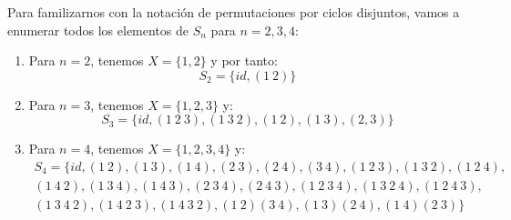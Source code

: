 \begin{ejemplo}
    Para familizarnos con la notación de permutaciones por ciclos disjuntos, vamos a enumerar todos los elementos de $S_n$ para $n=2,3,4$:
    \begin{enumerate}
        \item Para $n=2$, tenemos $X=\{1,2\}$ y por tanto:
            \begin{equation*}
                S_2 = \{id, (1\ 2)\}
            \end{equation*}
        \item Para $n=3$, tenemos $X=\{1,2,3\}$ y:
            \begin{equation*}
                S_3 = \{id, (1\ 2\ 3), (1\ 3\ 2), (1\ 2), (1\ 3), (2, 3)\}
            \end{equation*}
        \item Para $n=4$, tenemos $X=\{1,2,3,4\}$ y:
            \begin{multline*}
                S_4 = \{id, (1\ 2), (1\ 3), (1\ 4), (2\ 3), (2\ 4), (3\ 4), (1\ 2\ 3), (1\ 3\ 2), (1\ 2\ 4), \\
                    (1\ 4\ 2), (1\ 3\ 4), (1\ 4\ 3), (2\ 3\ 4), (2\ 4\ 3), (1\ 2\ 3\ 4), (1\ 3\ 2\ 4), (1\ 2\ 4\ 3), \\
                (1\ 3\ 4\ 2), (1\ 4\ 2\ 3), (1\ 4\ 3\ 2), (1\ 2)(3\ 4), (1\ 3)(2\ 4), (1\ 4)(2\ 3)\}
            \end{multline*}
    \end{enumerate}
\end{ejemplo}


